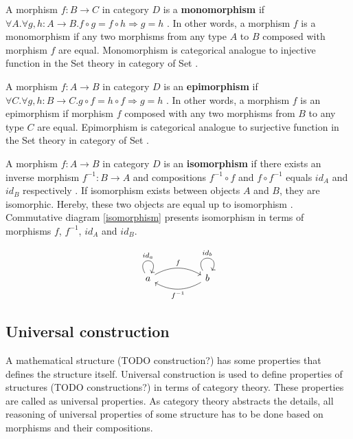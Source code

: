 \documentclass[article]{aaltoseries}
\begin{document}
    A morphism $f: B \rightarrow C$ in category $D$ is a \textbf{monomorphism}
    if $\forall A. \forall g, h: A \rightarrow B. f \circ g = f \circ h
    \Rightarrow g = h$ \cite{barr1990category, pierce1991basic}. In other words,
    a morphism $f$ is a monomorphism if any two morphisms from any type $A$ to
    $B$ composed with morphism $f$ are equal. Monomorphism is categorical
    analogue to injective function in the Set theory in category of Set
    \cite{barr1990category, pierce1991basic}.

    A morphism $f: A \rightarrow B$ in category $D$ is an \textbf{epimorphism}
    if $\forall C. \forall g, h: B \rightarrow C. g \circ f = h \circ f
    \Rightarrow g = h$ \cite{barr1990category, pierce1991basic}. In other words,
    a morphism $f$ is an epimorphism if morphism $f$ composed with any two
    morphisms from $B$ to any type $C$ are equal. Epimorphism is categorical
    analogue to surjective function in the Set theory in category of Set
    \cite{barr1990category, pierce1991basic}.

    A morphism $f: A \rightarrow B$ in category $D$ is an \textbf{isomorphism}
    if there exists an inverse morphism $f^{-1}: B \rightarrow A$ and
    compositions $f^{-1} \circ f$ and $f \circ f^{-1}$ equals $id_A$ and $id_B$
    respectively \cite{barr1990category, pierce1991basic}. If isomorphism exists
    between objects $A$ and $B$, they are isomorphic. Hereby, these two objects
    are equal up to isomorphism \cite{pierce1991basic}. Commutative diagram
    \ref{isomorphism} presents isomorphism in terms of morphisms $f$, $f^{-1}$,
    $id_A$ and $id_B$.

    \begin{equation}
      \label{isomorphism}
      \begin{tikzcd}[row sep=huge, column sep=huge]
        a \arrow[r, bend left, "f"]
        \arrow[loop above, distance=2em, in=60, out=120, "id_a"]
        & b \arrow[l, bend left, "f^{-1}"]
        \arrow[loop above, distance=2em, in=60, out=120, "id_b"]
      \end{tikzcd}
    \end{equation}


  \subsection{Universal construction} 
    A mathematical structure (TODO construction?) has some properties that defines the
    structure itself. Universal construction is used to define properties of
    structures (TODO constructions?) in terms of category theory. These properties are
    called as universal properties. As category theory abstracts the details, all
    reasoning of universal properties of some structure has to be done based on
    morphisms and their compositions.
 
\end{document}
